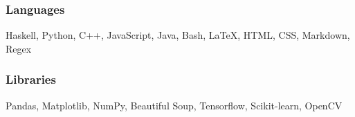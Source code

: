 \documentclass{article}
\makeatletter
\newcommand{\smallbullet}{\,\begin{picture}(-1,1)(-1,-3)\circle*{3}\end{picture}\ }
\newenvironment{resumeItem}
{
    \vspace{0.5em}
}
{
}
\newcommand{\experienceHead}[4]{
    \textbf{#1} @ #2 \hfill #3 \\[-1.2em]
}
\newenvironment{resumeList}
{
    \begin{itemize}[label=\smallbullet]
}
{
    \end{itemize}
}
\makeatother
\begin{document}





\begin{resumeItem}
\subsubsection{Languages}
Haskell, Python, C++, JavaScript, Java, Bash, {\LaTeX}, HTML, CSS, Markdown, Regex

\subsubsection{Libraries}
Pandas, Matplotlib, NumPy, Beautiful Soup, Tensorflow, Scikit-learn, OpenCV
\end{resumeItem}
\end{document}
